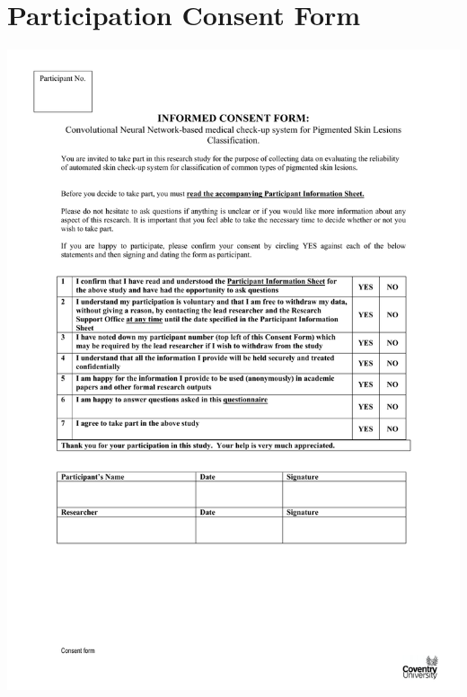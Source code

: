 \section*{Participation Consent Form}
\begin{center}
    \includegraphics[width=15cm]{Documents/consent.pdf}
\end{center}

